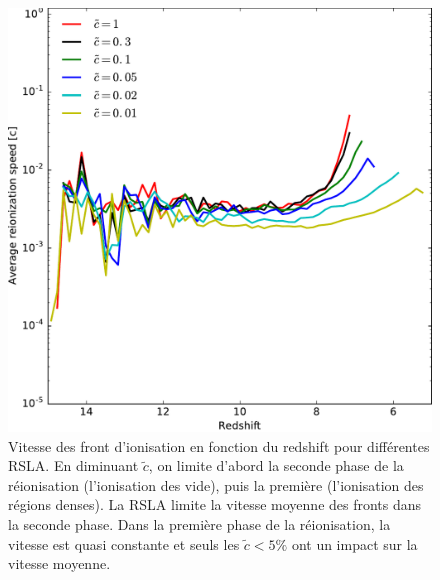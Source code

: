 \begin{figure}
\centering
		\includegraphics[width=.9\linewidth]{img/04_mapreio/avg_reionization_speed.pdf} 
        \caption[Évolution de la vitesse moyenne des fronts]{Vitesse des front d'ionisation en fonction du redshift pour différentes \ac{RSLA}.
        En diminuant $\tilde{c}$, on limite d'abord la seconde phase de la réionisation (l'ionisation des vide), puis la première (l'ionisation des régions denses).
        La \ac{RSLA} limite la vitesse moyenne des fronts dans la seconde phase.
        Dans la première phase de la réionisation, la vitesse est quasi constante et seuls les $\tilde{c} < 5\% $ ont un impact sur la vitesse moyenne.
        }        
 		\label{fig:vreioz_avg}
\end{figure}



